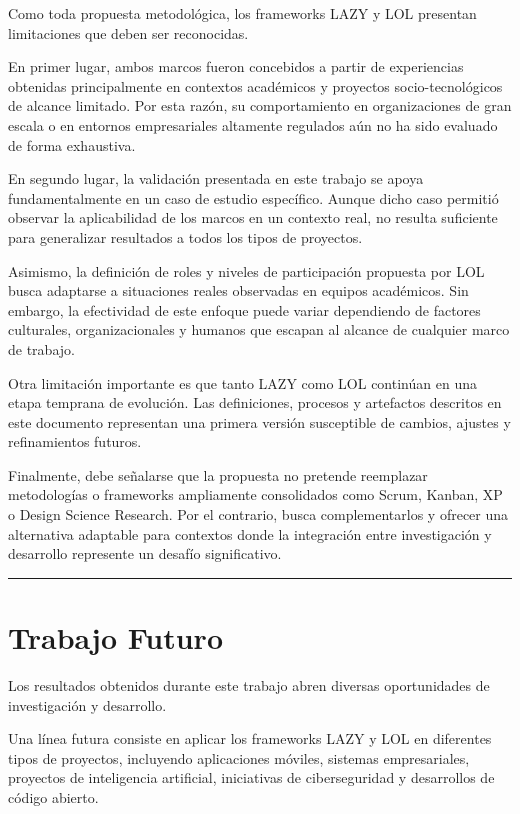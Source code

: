 \documentclass[14pt,a4paper,oneside]{extbook}
\begin{document}
Como toda propuesta metodológica, los frameworks LAZY y LOL presentan limitaciones que deben ser reconocidas.

En primer lugar, ambos marcos fueron concebidos a partir de experiencias obtenidas principalmente en contextos académicos y proyectos socio-tecnológicos de alcance limitado. Por esta razón, su comportamiento en organizaciones de gran escala o en entornos empresariales altamente regulados aún no ha sido evaluado de forma exhaustiva.

En segundo lugar, la validación presentada en este trabajo se apoya fundamentalmente en un caso de estudio específico. Aunque dicho caso permitió observar la aplicabilidad de los marcos en un contexto real, no resulta suficiente para generalizar resultados a todos los tipos de proyectos.

Asimismo, la definición de roles y niveles de participación propuesta por LOL busca adaptarse a situaciones reales observadas en equipos académicos. Sin embargo, la efectividad de este enfoque puede variar dependiendo de factores culturales, organizacionales y humanos que escapan al alcance de cualquier marco de trabajo.

Otra limitación importante es que tanto LAZY como LOL continúan en una etapa temprana de evolución. Las definiciones, procesos y artefactos descritos en este documento representan una primera versión susceptible de cambios, ajustes y refinamientos futuros.

Finalmente, debe señalarse que la propuesta no pretende reemplazar metodologías o frameworks ampliamente consolidados como Scrum, Kanban, XP o Design Science Research. Por el contrario, busca complementarlos y ofrecer una alternativa adaptable para contextos donde la integración entre investigación y desarrollo represente un desafío significativo.

\par\vspace{1.5em}\noindent\hfill\rule{0.25\textwidth}{0.6pt}\hfill\par\vspace{1.5em}

\section{Trabajo Futuro}

Los resultados obtenidos durante este trabajo abren diversas oportunidades de investigación y desarrollo.

Una línea futura consiste en aplicar los frameworks LAZY y LOL en diferentes tipos de proyectos, incluyendo aplicaciones móviles, sistemas empresariales, proyectos de inteligencia artificial, iniciativas de ciberseguridad y desarrollos de código abierto.
\end{document}
